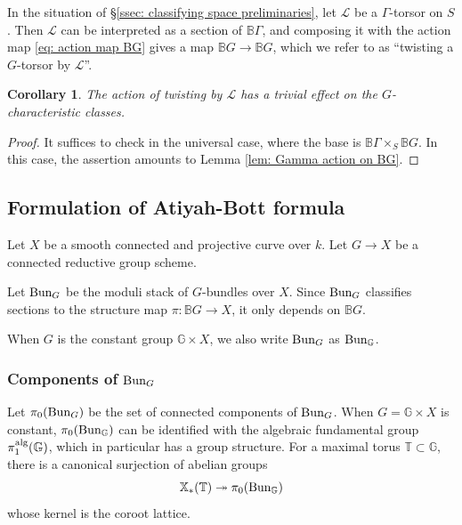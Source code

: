 \documentclass[reqno]{amsart}
\numberwithin{equation}{subsection}
\newtheorem{cor}[subsubsection]{Corollary}
\theoremstyle{definition}
\def\BB{\mathbb{B}}
\def\GG{\mathbb{G}}
\def\TT{\mathbb{T}}
\newcommand\cL{\mathcal{L}}
\newcommand\alg{\textup{alg}}
\newcommand{\Bun}{\textup{Bun}}
\newcommand\xcoch{\mathbb{X}_*}
\newcommand{\surj}{\twoheadrightarrow}
\newcommand{\rH}{\ensuremath{\mathrm{H}}\xspace}
\begin{document}
In the situation of \S\ref{ssec: classifying space preliminaries}, let $\cL$ be a $\Gamma$-torsor on $S$. Then $\cL$ can be interpreted as a section of $\BB \Gamma$, and composing it with the action map \eqref{eq: action map BG} gives a map $\BB G \rightarrow \BB G$, which we refer to as ``twisting a $G$-torsor by $\cL$''.

\begin{cor}\label{cor: twisting Chern classes}
The action of twisting by $\cL$ has a trivial effect on the $G$-characteristic classes. 
\end{cor}

\begin{proof}
It suffices to check in the universal case, where the base is $\BB \Gamma \times_S \BB G$. In this case, the assertion amounts to Lemma \ref{lem: Gamma action on BG}. 
\end{proof}




\subsection{Formulation of Atiyah-Bott formula}


Let $X$ be a smooth connected and projective curve over $k$. Let $G\to X$ be a connected reductive group scheme.

Let $\Bun_{G}$ be the moduli stack of $G$-bundles over $X$. Since $\Bun_{G}$ classifies sections to the structure map $\pi: \BB G\to X$, it only depends on $\BB G$.

When $G$ is the constant group $\GG\times X$, we also write $\Bun_{G}$ as $\Bun_{\GG}$.

\subsubsection{Components of $\Bun_{G}$} 


Let $\pi_{0}(\Bun_{G})$ be the set of connected components of $\Bun_{G}$. When $G=\GG\times X$ is constant, $\pi_{0}(\Bun_{\GG})$ can be identified with the algebraic fundamental group $\pi_{1}^{\alg}(\GG)$, which in particular has a group structure. For a maximal torus $\TT\subset \GG$, there is a canonical surjection of abelian groups
\begin{equation}\label{eq: pi0}
\xcoch(\TT)\surj \pi_{0}(\Bun_{\GG})
\end{equation}
whose kernel is the coroot lattice. 
\end{document}
